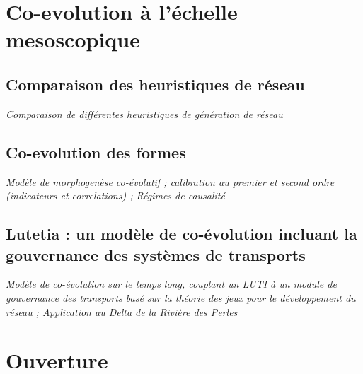 \section{Co-evolution à l'échelle mesoscopique}


\subsection{Comparaison des heuristiques de réseau}

\textit{Comparaison de différentes heuristiques de génération de réseau}


\subsection{Co-evolution des formes}

\textit{Modèle de morphogenèse co-évolutif ; calibration au premier et second ordre (indicateurs et correlations) ; Régimes de causalité}



\subsection{Lutetia : un modèle de co-évolution incluant la gouvernance des systèmes de transports}


\textit{Modèle de co-évolution sur le temps long, couplant un LUTI à un module de gouvernance des transports basé sur la théorie des jeux pour le développement du réseau ; Application au Delta de la Rivière des Perles}







\section{Ouverture}




